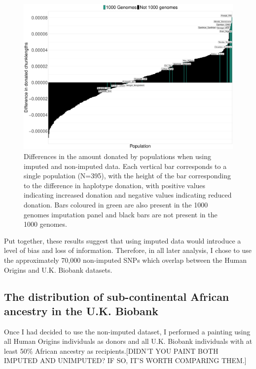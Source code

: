 \begin{figure}
	    \centering
	    \includegraphics[width=1.0\textwidth]{../images/chapter3/imputed_excess_copying_pops.pdf}
	    \caption{Differences in the amount donated by populations when using imputed and non-imputed data. Each vertical bar corresponds to a single population (N=395), with the height of the bar corresponding to the difference in haplotype donation, with positive values indicating increased donation and negative values indicating reduced donation. Bars coloured in green are also present in the 1000 genomes imputation panel and black bars are not present in the 1000 genomes.}
	    \label{fig:imputed_excess_copying_pops}
\end{figure}

Put together, these results suggest that using imputed data would introduce a level of bias and loss of information. Therefore, in all later analysis, I chose to use the approximately 70,000 non-imputed SNPs which overlap between the Human Origins and U.K. Biobank datasets. 

\subsection{The distribution of sub-continental African ancestry in the U.K. Biobank}

Once I had decided to use the non-imputed dataset, I performed a painting using all Human Origins individuals as donors and all U.K. Biobank individuals with at least 50\% African ancestry as recipients.{\color{red}[DIDN'T YOU PAINT BOTH IMPUTED AND UNIMPUTED? IF SO, IT'S WORTH COMPARING THEM.]} 

